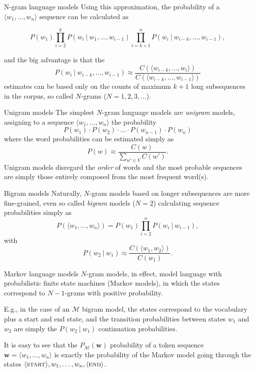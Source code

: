 \documentclass[style=upen, size=14pt]{powerdot}
\newcommand{\gold}{\color{arany}}
\theoremstyle{definition}
\begin{document}
\begin{slide}[toc=N-grams]{N-gram language models}
  Using this approximation, the probability of a $\langle w_1,\dots,w_n \rangle$
  sequence can be calculated as
  \begin{small}
  $$
  P(w_1) \prod_{i=2}^k P(w_{i} ~\vert~ w_{1},\dots,w_{i-1})  \prod_{i=k+1}^n P(w_{i} ~\vert~ w_{i-k},\dots,w_{i-1}),
  $$
\end{small}
and the big advantage is that the
  $$
  P(w_{i} ~\vert~ w_{i-k},\dots,w_{i-1}) \approx
\frac{C(\langle w_{i-k},\dots,w_{i}\rangle)}{C(\langle w_{i-k},\dots,w_{i-1} \rangle)}
  $$
  estimates can be based only on the counts of maximum $k+1$ long subsequences
  in the corpus, so called $N$-grams ($N=1, 2, 3,\dots$).
\end{slide}

\begin{slide}[toc=Unigram models]{Unigram models}
  The simplest $N$-gram language models are \emph{\gold unigram} models,
  assigning to a sequence $\langle w_1,\dots,w_n \rangle$ the probability
  $$
  P(w_1)\cdot P(w_2)\cdot \dots \cdot P(w_{n-1})\cdot P(w_n)
  $$
  where the word probabilities can be estimated simply as
  $$
  P(w) \approx \frac{C(w)}{\sum_{w' \in V}C(w')}.
  $$
  Unigram models disregard the \emph{order} of words and the most probable
  sequences are simply those entirely composed from the most frequent word(s).
\end{slide}

\begin{slide}[toc=Bigram models]{Bigram models}
  Naturally, $N$-gram models based on longer subsequences are more fine-grained,
  even so called \emph{bigram} models ($N=2$) calculating sequence probabilities
  simply as
  $$
  P(\langle w_1,\dots,w_n \rangle) = P(w_1)\prod_{i=2}^n P(w_i ~\vert~ w_{i-1}),
  $$
  with
  $$
  P(w_2~\vert~ w_1) \approx \frac{C(\langle w_1,w_2\rangle)}{C(w_1)}.
  $$
\end{slide}

\begin{slide}[toc=Markov models]{Markov language models}
  $N$-gram models, in effect, model language with probabilistic finite state
  machines (Markov models), in which the states correspond to $N-1$-grams with
  positive probability.\bigskip

  E.g., in the case of an $\mathcal M$ bigram model, the states correspond to
  the vocabulary plus a start and end state, and the transition probabilities
  between states $w_1$ and $w_2$ are simply the $P(w_2 ~\vert~ w_1)$
  continuation probabilities.\bigskip

  It is easy to see that the $P_\mathcal{M}(\mathbf{w})$ probability of a token
  sequence $\mathbf{w}=\langle w_1,\dots,w_n \rangle$ is exactly the
  probability of the Markov model going through the states
  $\langle \textsc{start}\rangle,w_1,\dots,w_n,\langle\textsc{end}\rangle$.
\end{slide}
\end{document}
